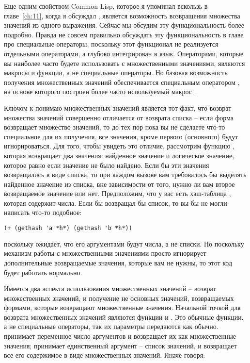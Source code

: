 Еще одним свойством Common Lisp, которое я упоминал вскользь в главе~\ref{ch:11}, когда я
обсуждал , является возможность возвращения множества значений из одного
выражения. Сейчас мы обсудим эту функциональность более подробно. Правда не совсем
правильно обсуждать эту функциональность в главе про специальные операторы, поскольку этот
функционал не реализуется отдельными операторами, а глубоко интегрирован в
язык. Операторами, которые вы наиболее часто будете использовать с множественными
значениями, являются макросы и функции, а не специальные операторы.  Но базовая
возможность получения множественных значений обеспечивается специальным оператором
, на основе которого построен более часто используемый макрос
.

Ключом к понимаю множественных значений является тот факт, что возврат множества значений
совершенно отличается от возврата списка -- если форма возвращает множество значений, то
до тех пор пока вы не сделаете что-то специальное для их получения, все значения, кроме
первого (основного) будут игнорироваться.  Для того, чтобы увидеть это отличие, рассмотрим
функцию , которая возвращает два значения: найденное значение и логическое
значение, которое равно  если значение не было найдено.  Если бы эти значения
возвращались в виде списка, то при каждом вызове  вам требовалось бы
выделять найденное значение из списка, вне зависимости от того, нужно ли вам второе
возвращаемое значение или нет.  Предположим, что у вас есть хэш-таблица ,
которая содержит числа.  Если бы  возвращал бы список, то вы бы не могли
написать что-то подобное:

\begin{lstlisting}
(+ (gethash 'a *h*) (gethash 'b *h*))
\end{lstlisting}

поскольку \code{+} ожидает, что его аргументами будут числа, а не списки. Но поскольку
механизм работы с множественными значениями просто игнорирует дополнительные возвращаемые
значения, которые вам не нужны, то этот код будет работать нормально.

Имеется два аспекта использования множественных значений -- возврат множественных
значений, и получение не основных значений, возвращаемых формами, которые возвращают
множественные значения.  Начальной точкой для возврата множественных значений являются
функции  и .  Это обычные функции, а не специальные
операторы, так их параметры передаются как обычно.   принимает переменное
число аргументов и возвращает их как множественные значения;  принимает
единственный аргумент -- список значений, и возвращает все его содержимое в виде
множественных значений.  Иначе говоря:


